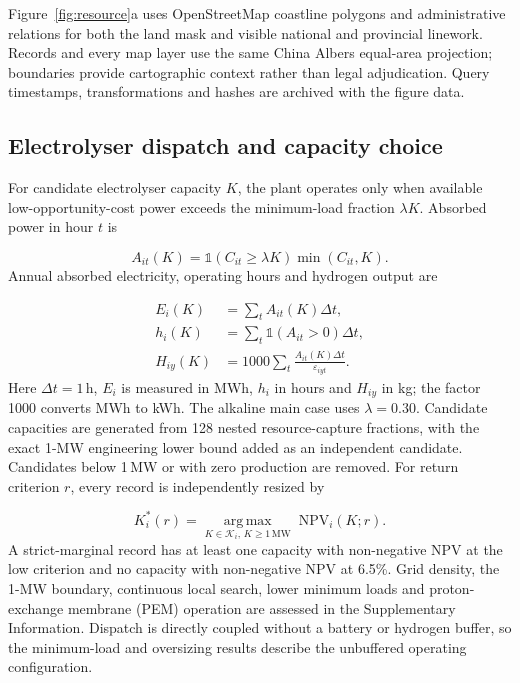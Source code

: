 \documentclass[pdflatex,sn-nature]{sn-jnl}
\begin{document}
Figure~\ref{fig:resource}a uses OpenStreetMap coastline polygons and administrative relations for both the land mask and visible national and provincial linework\cite{osmcoast}. Records and every map layer use the same China Albers equal-area projection; boundaries provide cartographic context rather than legal adjudication. Query timestamps, transformations and hashes are archived with the figure data.

\subsection*{Electrolyser dispatch and capacity choice}

For candidate electrolyser capacity $K$, the plant operates only when available low-opportunity-cost power exceeds the minimum-load fraction $\lambda K$. Absorbed power in hour $t$ is

\begin{equation}
A_{it}(K)=\mathbb{1}\!\left(C_{it}\geq\lambda K\right)\min(C_{it},K).
\label{eq:dispatch}
\end{equation}
Annual absorbed electricity, operating hours and hydrogen output are

\begin{equation}
\begin{aligned}
E_i(K)&=\sum_t A_{it}(K)\Delta t,\\
h_i(K)&=\sum_t\mathbb{1}\!\left(A_{it}>0\right)\Delta t,\\
H_{iy}(K)&=1000\sum_t\frac{A_{it}(K)\Delta t}{\varepsilon_{iyt}}.
\end{aligned}
\label{eq:operation}
\end{equation}
Here $\Delta t=1$\,h, $E_i$ is measured in MWh, $h_i$ in hours and $H_{iy}$ in kg; the factor 1000 converts MWh to kWh. The alkaline main case uses $\lambda=0.30$. Candidate capacities are generated from 128 nested resource-capture fractions, with the exact 1-MW engineering lower bound added as an independent candidate. Candidates below 1\,MW or with zero production are removed. For return criterion $r$, every record is independently resized by

\begin{equation}
K_i^*(r)=\underset{K\in\mathcal{K}_i,\,K\geq1\,\mathrm{MW}}{\operatorname{arg\,max}}
\;\mathrm{NPV}_i(K;r).
\label{eq:capacity}
\end{equation}
A strict-marginal record has at least one capacity with non-negative NPV at the low criterion and no capacity with non-negative NPV at 6.5\%. Grid density, the 1-MW boundary, continuous local search, lower minimum loads and proton-exchange membrane (PEM) operation are assessed in the Supplementary Information. Dispatch is directly coupled without a battery or hydrogen buffer, so the minimum-load and oversizing results describe the unbuffered operating configuration.
\end{document}
